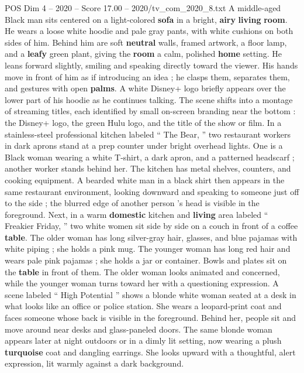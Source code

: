 \begin{textsample}{POS Dim 4 – 2020 – Score 17.00 – 2020/tv\_com\_2020\_8.txt}  \label{ex:f4_pos_009}
A middle-aged Black man sits centered on a light-colored \textbf{sofa} in a bright, \textbf{airy} \textbf{living} \textbf{room}.
He wears a loose white hoodie and pale gray pants, with white cushions on both sides of him.
Behind him are soft \textbf{neutral} walls, framed artwork, a floor lamp, and a \textbf{leafy} green plant, giving the \textbf{room} a calm, polished \textbf{home} setting.
He leans forward slightly, smiling and speaking directly toward the viewer.
His hands move in front of him as if introducing an idea ; he clasps them, separates them, and gestures with open \textbf{palms}.
A white Disney+ logo briefly appears over the lower part of his hoodie as he continues talking.
The scene shifts into a montage of streaming titles, each identified by small on-screen branding near the bottom : the Disney+ logo, the green Hulu logo, and the title of the show or film.
In a stainless-steel professional kitchen labeled “ The Bear, ” two restaurant workers in dark aprons stand at a prep counter under bright overhead lights.
One is a Black woman wearing a white T-shirt, a dark apron, and a patterned headscarf ; another worker stands behind her.
The kitchen has metal shelves, counters, and cooking equipment.
A bearded white man in a black shirt then appears in the same restaurant environment, looking downward and speaking to someone just off to the side ; the blurred edge of another person ’s head is visible in the foreground.
Next, in a warm \textbf{domestic} kitchen and \textbf{living} area labeled “ Freakier Friday, ” two white women sit side by side on a couch in front of a coffee \textbf{table}.
The older woman has long silver-gray hair, glasses, and blue pajamas with white piping ; she holds a pink mug.
The younger woman has long red hair and wears pale pink pajamas ; she holds a jar or container.
Bowls and plates sit on the \textbf{table} in front of them.
The older woman looks animated and concerned, while the younger woman turns toward her with a questioning expression.
A scene labeled “ High Potential ” shows a blonde white woman seated at a desk in what looks like an office or police station.
She wears a leopard-print coat and faces someone whose back is visible in the foreground.
Behind her, people sit and move around near desks and glass-paneled doors.
The same blonde woman appears later at night outdoors or in a dimly lit setting, now wearing a plush \textbf{turquoise} coat and dangling earrings.
She looks upward with a thoughtful, alert expression, lit warmly against a dark background.

\end{textsample}
